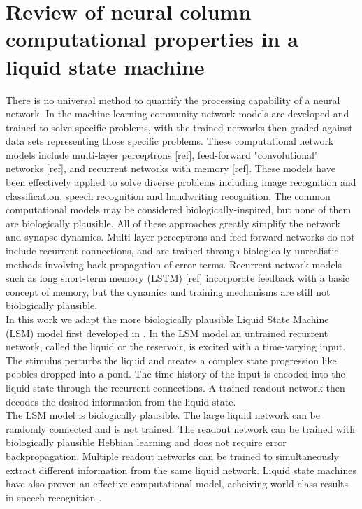 \documentclass[a4paper,11pt]{article}
\begin{document}
\section{Review of neural column computational properties in a liquid state machine}
There is no universal method to quantify the processing capability of a neural network.
In the machine learning community network models are developed and trained to solve specific problems, with the trained networks then graded against data sets representing those specific problems.
These computational network models include multi-layer perceptrons [ref], feed-forward "convolutional" networks [ref], and recurrent networks with memory [ref].
These models have been effectively applied to solve diverse problems including image recognition and classification, speech recognition and handwriting recognition.
The common computational models may be considered biologically-inspired, but none of them are biologically plausible.
All of these approaches greatly simplify the network and synapse dynamics.
Multi-layer perceptrons and feed-forward networks do not include recurrent connections, and are trained through biologically unrealistic methods involving back-propagation of error terms.
Recurrent network models such as long short-term memory (LSTM) [ref] incorporate feedback with a basic concept of memory, but the dynamics and training mechanisms are still not biologically plausible. \\
In this work we adapt the more biologically plausible Liquid State Machine (LSM) model first developed in \cite{maas2002}.
In the LSM model an untrained recurrent network, called the liquid or the reservoir, is excited with a time-varying input.
The stimulus perturbs the liquid and creates a complex state progression like pebbles dropped into a pond.
The time history of the input is encoded into the liquid state through the recurrent connections.
A trained readout network then decodes the desired information from the liquid state. \\
The LSM model is biologically plausible. 
The large liquid network can be randomly connected and is not trained.
The readout network can be trained with biologically plausible Hebbian learning and does not require error backpropagation.
Multiple readout networks can be trained to simultaneously extract different information from the same liquid network.
Liquid state machines have also proven an effective computational model, acheiving world-class results in speech recognition \cite{zhang2015}.
\\ \\
\end{document}
